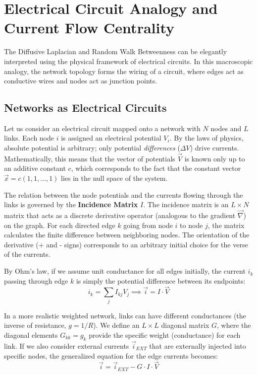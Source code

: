 \section{Electrical Circuit Analogy and Current Flow Centrality}
\label{app:electrical_analogy}

The Diffusive Laplacian and Random Walk Betweenness can be elegantly interpreted using the physical framework of electrical circuits. In this macroscopic analogy, the network topology forms the wiring of a circuit, where edges act as conductive wires and nodes act as junction points.

\subsection{Networks as Electrical Circuits}

Let us consider an electrical circuit mapped onto a network with $N$ nodes and $L$ links. Each node $i$ is assigned an electrical potential $V_i$. By the laws of physics, absolute potential is arbitrary; only potential \textit{differences} ($\Delta V$) drive currents. Mathematically, this means that the vector of potentials $\vec{V}$ is known only up to an additive constant $c$, which corresponds to the fact that the constant vector $\vec{x} = c(1, 1, \dots, 1)$ lies in the null space of the system.

The relation between the node potentials and the currents flowing through the links is governed by the \textbf{Incidence Matrix} $I$. The incidence matrix is an $L \times N$ matrix that acts as a discrete derivative operator (analogous to the gradient $\vec{\nabla}$) on the graph. For each directed edge $k$ going from node $i$ to node $j$, the matrix calculates the finite difference between neighboring nodes. The orientation of the derivative (+ and - signs) corresponds to an arbitrary initial choice for the verse of the currents.

By Ohm's law, if we assume unit conductance for all edges initially, the current $i_k$ passing through edge $k$ is simply the potential difference between its endpoints:
\[
    i_k = \sum_{j} I_{kj} V_j \implies \vec{i} = I \cdot \vec{V}
\]

In a more realistic weighted network, links can have different conductances (the inverse of resistance, $g = 1/R$). We define an $L \times L$ diagonal matrix $G$, where the diagonal elements $G_{kk} = g_k$ provide the specific weight (conductance) for each link. If we also consider external currents $\vec{i}_{EXT}$ that are externally injected into specific nodes, the generalized equation for the edge currents becomes:
\[
    \vec{i} = \vec{i}_{EXT} - G \cdot I \cdot \vec{V}
\]

